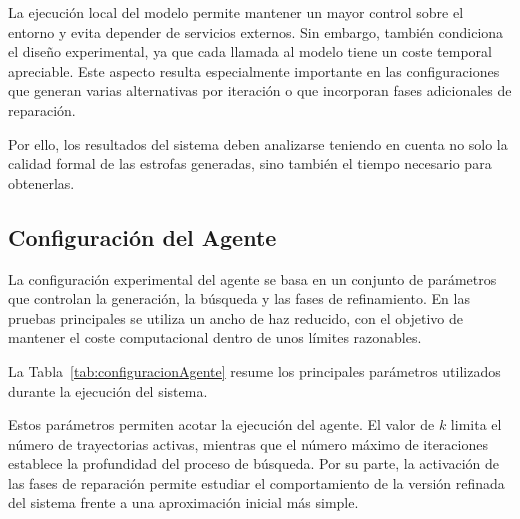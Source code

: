 \documentclass[12pt,a4paper,twoside,openright]{book}
\begin{document}
La ejecución local del modelo permite mantener un mayor control sobre el entorno y evita depender de servicios externos. Sin embargo, también condiciona el diseño experimental, ya que cada llamada al modelo tiene un coste temporal apreciable.
Este aspecto resulta especialmente importante en las configuraciones que generan varias alternativas por iteración o que incorporan fases adicionales de reparación.

Por ello, los resultados del sistema deben analizarse teniendo en cuenta no solo la calidad formal de las estrofas generadas, sino también el tiempo necesario para obtenerlas.

\subsection{Configuración del Agente}

La configuración experimental del agente se basa en un conjunto de parámetros que controlan la generación, la búsqueda y las fases de refinamiento. En las pruebas principales se utiliza un ancho de haz reducido,
con el objetivo de mantener el coste computacional dentro de unos límites razonables.

La Tabla~\ref{tab:configuracionAgente} resume los principales parámetros utilizados durante la ejecución del sistema.

Estos parámetros permiten acotar la ejecución del agente. El valor de $k$ limita el número de trayectorias activas, mientras que el número máximo de iteraciones establece la profundidad del proceso de búsqueda.
Por su parte, la activación de las fases de reparación permite estudiar el comportamiento de la versión refinada del sistema frente a una aproximación inicial más simple.
\end{document}
